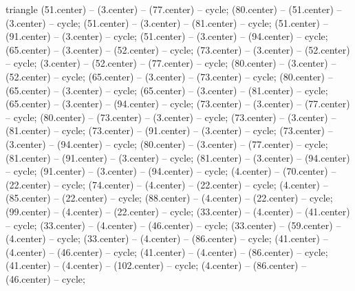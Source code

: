 \begin{pgfonlayer}{triangle}
 (51.center) -- (3.center) -- (77.center) -- cycle; 
 (80.center) -- (51.center) -- (3.center) -- cycle; 
 (51.center) -- (3.center) -- (81.center) -- cycle; 
 (51.center) -- (91.center) -- (3.center) -- cycle; 
 (51.center) -- (3.center) -- (94.center) -- cycle; 
 (65.center) -- (3.center) -- (52.center) -- cycle; 
 (73.center) -- (3.center) -- (52.center) -- cycle; 
 (3.center) -- (52.center) -- (77.center) -- cycle; 
 (80.center) -- (3.center) -- (52.center) -- cycle; 
 (65.center) -- (3.center) -- (73.center) -- cycle; 
 (80.center) -- (65.center) -- (3.center) -- cycle; 
 (65.center) -- (3.center) -- (81.center) -- cycle; 
 (65.center) -- (3.center) -- (94.center) -- cycle; 
 (73.center) -- (3.center) -- (77.center) -- cycle; 
 (80.center) -- (73.center) -- (3.center) -- cycle; 
 (73.center) -- (3.center) -- (81.center) -- cycle; 
 (73.center) -- (91.center) -- (3.center) -- cycle; 
 (73.center) -- (3.center) -- (94.center) -- cycle; 
 (80.center) -- (3.center) -- (77.center) -- cycle; 
 (81.center) -- (91.center) -- (3.center) -- cycle; 
 (81.center) -- (3.center) -- (94.center) -- cycle; 
 (91.center) -- (3.center) -- (94.center) -- cycle; 
 (4.center) -- (70.center) -- (22.center) -- cycle; 
 (74.center) -- (4.center) -- (22.center) -- cycle; 
 (4.center) -- (85.center) -- (22.center) -- cycle; 
 (88.center) -- (4.center) -- (22.center) -- cycle; 
 (99.center) -- (4.center) -- (22.center) -- cycle; 
 (33.center) -- (4.center) -- (41.center) -- cycle; 
 (33.center) -- (4.center) -- (46.center) -- cycle; 
 (33.center) -- (59.center) -- (4.center) -- cycle; 
 (33.center) -- (4.center) -- (86.center) -- cycle; 
 (41.center) -- (4.center) -- (46.center) -- cycle; 
 (41.center) -- (4.center) -- (86.center) -- cycle; 
 (41.center) -- (4.center) -- (102.center) -- cycle; 
 (4.center) -- (86.center) -- (46.center) -- cycle; 

\end{pgfonlayer}
